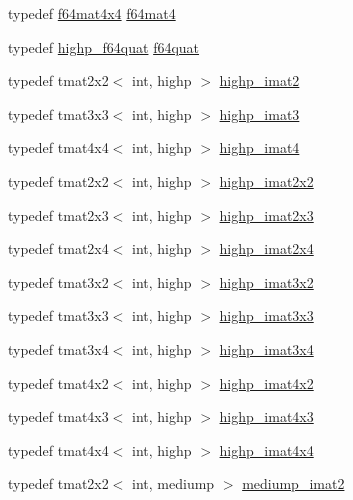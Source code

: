 \begin{DoxyCompactItemize}
\item 
typedef \hyperlink{group__gtc__type__precision_ga6b1ada50de2fc7d991138ab857fb2476}{f64mat4x4} \hyperlink{group__gtc__type__precision_ga5bfcfa195cfe908fe50ecc15abbf7979}{f64mat4}
\item 
typedef \hyperlink{namespaceglm_a50e023f42b7d0e2f40eff32ace71ae1a}{highp\+\_\+f64quat} \hyperlink{group__gtc__type__precision_ga5b54d7b36fbee5e271f73e6ed74e7172}{f64quat}
\item 
typedef tmat2x2$<$ int, highp $>$ \hyperlink{group__gtc__matrix__integer_gae1cd6ff099593d2f215bd4ceed538200}{highp\+\_\+imat2}
\item 
typedef tmat3x3$<$ int, highp $>$ \hyperlink{group__gtc__matrix__integer_ga0766d11d0154f42893ef0912ab7c6a2c}{highp\+\_\+imat3}
\item 
typedef tmat4x4$<$ int, highp $>$ \hyperlink{group__gtc__matrix__integer_gaa5eedcb20883541c3f7f2862cbd0b446}{highp\+\_\+imat4}
\item 
typedef tmat2x2$<$ int, highp $>$ \hyperlink{group__gtc__matrix__integer_gab4411f2d106d24a32aaa3cb711dc8510}{highp\+\_\+imat2x2}
\item 
typedef tmat2x3$<$ int, highp $>$ \hyperlink{group__gtc__matrix__integer_ga6c1a5f4d85de3f7eccb394970320bafc}{highp\+\_\+imat2x3}
\item 
typedef tmat2x4$<$ int, highp $>$ \hyperlink{group__gtc__matrix__integer_gae7502957eb2ab9268726d87389ae2b55}{highp\+\_\+imat2x4}
\item 
typedef tmat3x2$<$ int, highp $>$ \hyperlink{group__gtc__matrix__integer_ga2c8dc817124f44bc01f27777bfce983b}{highp\+\_\+imat3x2}
\item 
typedef tmat3x3$<$ int, highp $>$ \hyperlink{group__gtc__matrix__integer_gaecb62c11fb25aadbb7eecc2da226d444}{highp\+\_\+imat3x3}
\item 
typedef tmat3x4$<$ int, highp $>$ \hyperlink{group__gtc__matrix__integer_gabcd2d8d764b11db413259ee5cafd8446}{highp\+\_\+imat3x4}
\item 
typedef tmat4x2$<$ int, highp $>$ \hyperlink{group__gtc__matrix__integer_ga7b936ac315e12b546d2597a4bffee4a1}{highp\+\_\+imat4x2}
\item 
typedef tmat4x3$<$ int, highp $>$ \hyperlink{group__gtc__matrix__integer_ga28e21d3fe05d8476402e27081150cade}{highp\+\_\+imat4x3}
\item 
typedef tmat4x4$<$ int, highp $>$ \hyperlink{group__gtc__matrix__integer_ga2a80b8ab686297145ecf713699233114}{highp\+\_\+imat4x4}
\item 
typedef tmat2x2$<$ int, mediump $>$ \hyperlink{group__gtc__matrix__integer_gae812330b83568359273b6ec96b002863}{mediump\+\_\+imat2}

\end{DoxyCompactItemize}

